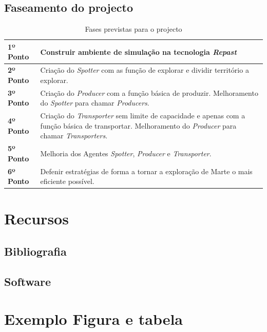 \documentclass[a4paper, 12pt, twoside]{scrreprt}
\begin{document}
\section{Faseamento do projecto}

\begin{table}[htb]
\centering
\caption{Fases previstas para o projecto}
    \sffamily \begin{tabularx}{1.0\textwidth}{ p{3cm}  p{} }
    \hline
    \textbf{1º Ponto} \hfill & Construir ambiente de simulação na tecnologia \textit{Repast} \\ \hline
    \textbf{2º Ponto} \hfill & Criação do \textit{Spotter} com as função de explorar e dividir território a explorar. \\ \hline
    \textbf{3º Ponto} \hfill & Criação do \textit{Producer} com a função básica de produzir. Melhoramento do \textit{Spotter} para chamar \textit{Producers}. \\ \hline
    \textbf{4º Ponto} \hfill & Criação do \textit{Transporter} sem limite de capacidade e apenas com a função básica de transportar. Melhoramento do \textit{Producer} para chamar \textit{Transporters}. \\ \hline
    \textbf{5º Ponto} \hfill & Melhoria dos Agentes \textit{Spotter}, \textit{Producer} e \textit{Transporter}. \\ \hline
    \textbf{6º Ponto} \hfill & Defenir estratégias de forma a tornar a exploração de Marte o mais eficiente possível. \\ \hline
    \end{tabularx} \normalfont
\label{table:Emissivity}
\end{table}

\chapter{Recursos}
\section{Bibliografia}
\section{Software}


\chapter{Exemplo Figura e tabela}
\end{document}
